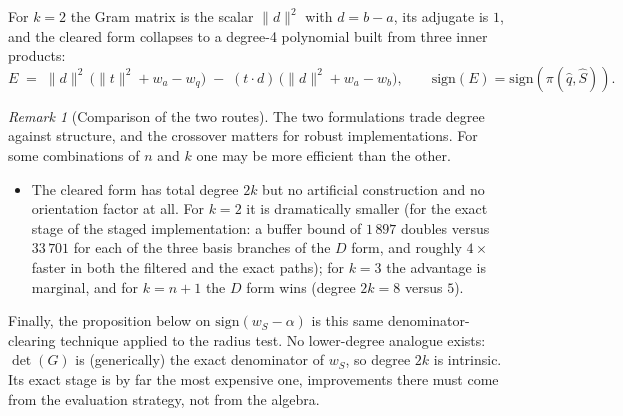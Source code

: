 \documentclass[12pt]{article}
\theoremstyle{definition}
\theoremstyle{remark}
\newtheorem{remark}[theorem]{Remark}
\begin{document}
For $k = 2$ the Gram matrix is the scalar $\|d\|^2$ with $d = b - a$, its
adjugate is $1$, and the cleared form collapses to a degree-4 polynomial built
from three inner products:
\begin{equation*}
    E \;=\; \|d\|^2\,\big(\|t\|^2 + w_a - w_q\big) \;-\; (t \cdot d)\,\big(\|d\|^2 + w_a - w_b\big),
    \qquad \mathrm{sign}(E) = \mathrm{sign}(\pi(\hat q, \hat S)).
\end{equation*}

\begin{remark}[Comparison of the two routes]
The two formulations trade degree against structure, and the crossover matters for robust implementations. For some combinations of $n$ and $k$ one may be more efficient than the other.
\begin{itemize}
    \item The cleared form has total degree $2k$ but no artificial construction and no orientation factor at all. For $k = 2$ it is dramatically smaller (for
    the exact stage of the staged implementation: a buffer bound of $1\,897$
    doubles versus $33\,701$ for each of the three basis branches of the $D$
    form, and roughly $4\times$ faster in both the filtered and the exact
    paths); for $k = 3$ the advantage is marginal, and for $k = n+1$ the $D$
    form wins (degree $2k = 8$ versus $5$).
\end{itemize}
Finally, the proposition below on $\mathrm{sign}(w_S - \alpha)$ is this same
denominator-clearing technique applied to the radius test.
No lower-degree analogue exists:
$\det(G)$ is (generically) the exact denominator of $w_S$, so degree $2k$ is
intrinsic. Its exact
stage is by far the most expensive one, improvements there must come from the
evaluation strategy, not from the algebra.
\end{remark}

\end{document}

